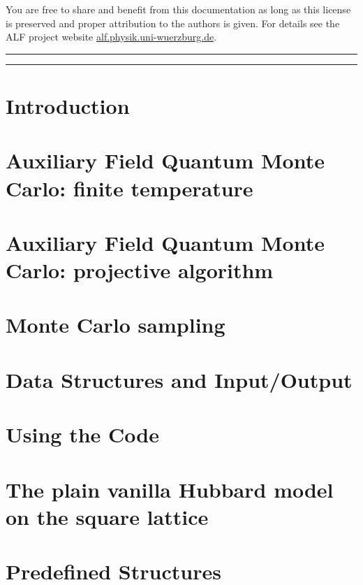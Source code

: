 \documentclass[submission, Phys]{SciPost}
\begin{document}
You are free to share and benefit from this documentation as long as this license is preserved
and proper attribution to the authors is given. For details see the ALF project
website \url{alf.physik.uni-wuerzburg.de}.

\vspace{10pt}
\noindent\rule{\textwidth}{1pt}
\tableofcontents\thispagestyle{fancy}
\noindent\rule{\textwidth}{1pt}
\vspace{10pt}

\section{Introduction}\label{sec:intro}

\section{Auxiliary Field Quantum Monte Carlo: finite temperature}\label{sec:def}




\section{Auxiliary Field Quantum Monte Carlo: projective algorithm}\label{sec:defT0}

\section{Monte Carlo sampling}\label{sec:sampling}

\section{Data Structures and Input/Output}\label{sec:imp}


\section{Using the Code}\label{sec:running}

\section{The plain vanilla Hubbard model on the square lattice} \label{sec:vanilla}

\section{Predefined Structures}\label{sec:predefined}

\end{document}
